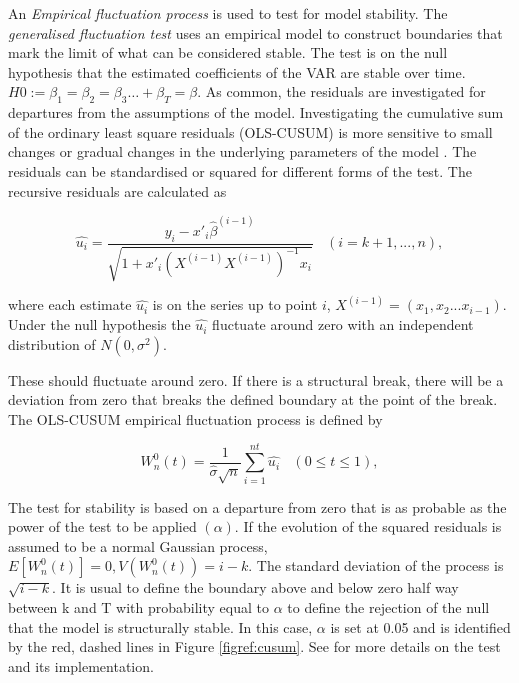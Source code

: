 \documentclass[12pt, a4paper, oneside]{article}\usepackage[]{graphicx}\usepackage[]{color}
\begin{document}
An \emph{Empirical fluctuation process} is used to test for model stability.  The \emph{generalised fluctuation test} uses an empirical model to construct boundaries that mark the limit of what can be considered stable.  The test is on the null hypothesis that the estimated coefficients of the VAR are stable over time.  $H0:= \beta_1 = \beta_2 = \beta_3 \ldots+\beta_T = \beta$.  As common, the residuals are investigated for departures from the assumptions of the model.  Investigating the cumulative sum of the ordinary least square residuals (OLS-CUSUM) is more sensitive to small changes or gradual changes in the underlying parameters of the model \citep{BrownCUSUM}.  The residuals can be standardised or squared for different forms of the test.    The recursive residuals are calculated as  

\begin{equation} 
\hat{u_i} = \frac{y_i - x'_i \hat{\beta}^{(i-1)}}{\sqrt{1 + x'_i (X^{(i-1)} X^{(i-1)})^{-1} x_i}} \: \: \: \:  (i = k+1,...,n),
\end{equation}

where each estimate $\hat{u_i}$ is on the series up to point $i$, $X^{(i-1)} = (x_1, x_2...x_{i-1})$.  Under the null hypothesis the $\hat{u_i}$ fluctuate around zero with an independent distribution of $N(0, \sigma^2)$.  
 
These should fluctuate around zero.  If there is a structural break, there will be a deviation from zero that breaks the defined boundary at the point of the break.  The OLS-CUSUM empirical fluctuation process is defined by 

\begin{equation}
W_n^0(t) = \frac{1}{\hat{\sigma}\sqrt{n}}\sum_{i = 1}^{nt} \hat{u_i} \: \: \: \: (0 \leq t \leq 1),
\end{equation}

The test for stability is based on a departure from zero that is as probable as the power of the test to be applied $(\alpha)$.  If the evolution of the squared residuals is assumed to be a normal Gaussian process,  $E[W_n^0(t)] = 0, V(W_n^0(t) ) = i-k$.    The standard deviation of the process is $\sqrt{i - k}$.  It is usual to define the boundary above and below zero half way between k and T with probability equal to $\alpha$ to define the rejection of the null that the model is structurally stable.  In this case, $\alpha$ is set at 0.05 and is identified by the red, dashed lines in Figure \ref{figref:cusum}.  See \citep{strucchange} for more details on the test and its implementation. 
\end{document}
